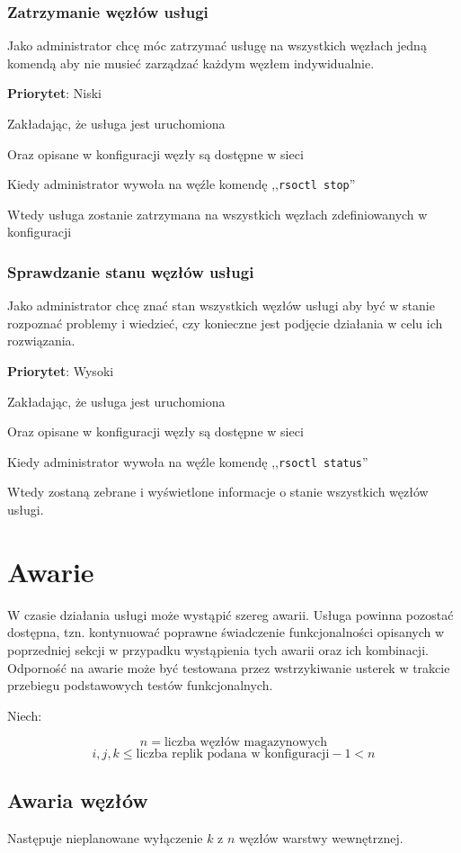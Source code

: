 \documentclass[a4paper,11pt]{article}
\begin{document}
\subsubsection{Zatrzymanie węzłów usługi}
Jako administrator chcę móc zatrzymać usługę na wszystkich węzłach jedną komendą aby nie musieć zarządzać każdym węzłem indywidualnie.

\textbf{Priorytet}: Niski

Zakładając, że usługa jest uruchomiona

Oraz opisane w konfiguracji węzły są dostępne w sieci

Kiedy administrator wywoła na węźle komendę ,,\texttt{rsoctl stop}''

Wtedy usługa zostanie zatrzymana na wszystkich węzłach zdefiniowanych w konfiguracji

\subsubsection{Sprawdzanie stanu węzłów usługi}
Jako administrator chcę znać stan wszystkich węzłów usługi aby być w
stanie rozpoznać problemy i wiedzieć, czy konieczne jest podjęcie
działania w celu ich rozwiązania.

\textbf{Priorytet}: Wysoki

Zakładając, że usługa jest uruchomiona

Oraz opisane w konfiguracji węzły są dostępne w sieci

Kiedy administrator wywoła na węźle komendę ,,\texttt{rsoctl status}''

Wtedy zostaną zebrane i wyświetlone informacje o stanie wszystkich
węzłów usługi.

\section{Awarie}
W czasie działania usługi może wystąpić szereg awarii. Usługa powinna
pozostać dostępna, tzn. kontynuować poprawne świadczenie funkcjonalności
opisanych w poprzedniej sekcji w przypadku wystąpienia tych awarii oraz
ich kombinacji. Odporność na awarie może być testowana przez
wstrzykiwanie usterek w trakcie przebiegu podstawowych testów
funkcjonalnych.

Niech:

\[ n = \mbox{liczba węzłów magazynowych} \]
\[ i, j, k \leq \mbox{liczba replik podana w konfiguracji} - 1 < n \]

\subsection{Awaria węzłów}
Następuje nieplanowane wyłączenie $k$ z $n$ węzłów warstwy wewnętrznej.
\end{document}
